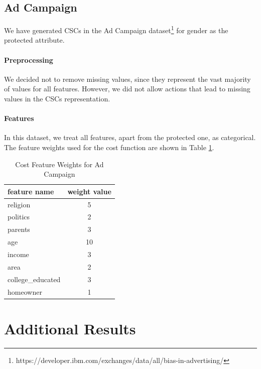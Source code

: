\documentclass{article}
\begin{document}
\subsection{Ad Campaign}
We have generated CSCs in the Ad Campaign dataset\footnote{https://developer.ibm.com/exchanges/data/all/bias-in-advertising/} for gender as the protected attribute. 

\paragraph{Preprocessing} We decided not to remove missing values, since they represent the vast majority of values for all features. However, we did not allow actions that lead to missing values in the CSCs representation.
\paragraph{Features} In this dataset, we treat all features, apart from the protected one, as categorical.
The feature weights used for the cost function are shown in Table \ref{table:feature-weights-ad-campaign}.

\begin{table}[ht]
    \small
    \centering
    \caption{Cost Feature Weights for Ad Campaign}
    \begin{tabular}{lc}
        \toprule
        \textbf{feature name} & \textbf{weight value} \\
        \midrule
        religion & 5 \\
        politics & 2 \\
        parents & 3 \\
        age & 10 \\
        income & 3 \\
        area & 2 \\
        college\_educated & 3 \\
        homeowner & 1 \\
        \bottomrule
    \end{tabular}
    \label{table:feature-weights-ad-campaign}
\end{table}



\section{Additional Results}
\label{sec:add_results}
\end{document}

